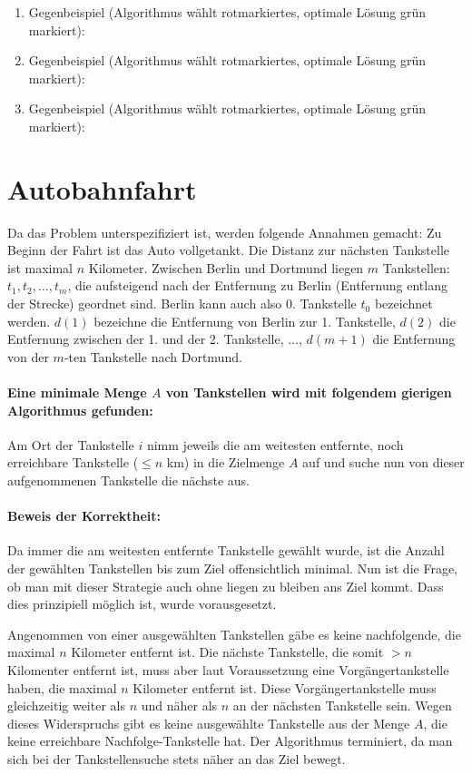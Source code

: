 \documentclass[a4paper,10pt]{scrartcl}
\begin{document}
\begin{enumerate}
    
  \item Gegenbeispiel (Algorithmus wählt rotmarkiertes, optimale Lösung grün markiert):
 \vfill

\item Gegenbeispiel (Algorithmus wählt rotmarkiertes, optimale Lösung grün markiert):

 \vfill
\item Gegenbeispiel (Algorithmus wählt rotmarkiertes, optimale Lösung grün markiert):

 \vfill
\end{enumerate}
\vfill
\section{Autobahnfahrt}
Da das Problem unterspezifiziert ist, werden folgende Annahmen gemacht: Zu Beginn der Fahrt ist das Auto vollgetankt. Die Distanz zur nächsten Tankstelle ist maximal $n$ Kilometer.
Zwischen Berlin und Dortmund liegen $m$ Tankstellen: $t_1, t_2, \hdots, t_m$, die aufsteigend nach der Entfernung zu Berlin (Entfernung entlang der Strecke) geordnet sind. Berlin kann auch also 0.
Tankstelle $t_0$ bezeichnet werden.
$d(1)$ bezeichne die Entfernung von Berlin zur 1. Tankstelle, $d(2)$ die Entfernung zwischen der 1. und der 2. Tankstelle, $\hdots$, $d(m + 1)$ die Entfernung von der $m$-ten Tankstelle nach Dortmund.

\paragraph*{Eine minimale Menge $A$ von Tankstellen wird mit folgendem gierigen Algorithmus gefunden:}
Am Ort der Tankstelle $i$ nimm jeweils die am weitesten entfernte, noch
erreichbare Tankstelle ($\le n$ km) in die Zielmenge $A$ auf und suche
nun von dieser aufgenommenen Tankstelle die nächste aus.

\paragraph*{Beweis der Korrektheit:}
Da immer die am weitesten entfernte Tankstelle gewählt wurde, ist die Anzahl der gewählten Tankstellen bis zum Ziel offensichtlich minimal.
Nun ist die Frage, ob man mit dieser Strategie auch ohne liegen zu bleiben ans Ziel kommt. Dass dies prinzipiell möglich ist, wurde vorausgesetzt.

Angenommen von einer ausgewählten Tankstellen gäbe es keine
nachfolgende, die maximal $n$ Kilometer entfernt ist. Die nächste Tankstelle, die somit $> n$ Kilomenter entfernt ist, muss aber laut Voraussetzung eine
Vorgängertankstelle haben, die maximal $n$ Kilometer entfernt ist. Diese
Vorgängertankstelle muss gleichzeitig weiter als $n$ und näher als $n$
an der nächsten Tankstelle sein. Wegen dieses Widerspruchs
gibt es keine ausgewählte Tankstelle aus der Menge $A$, die keine erreichbare Nachfolge-Tankstelle hat.
Der Algorithmus terminiert, da man sich bei der Tankstellensuche stets näher an das Ziel bewegt.
\end{document}

